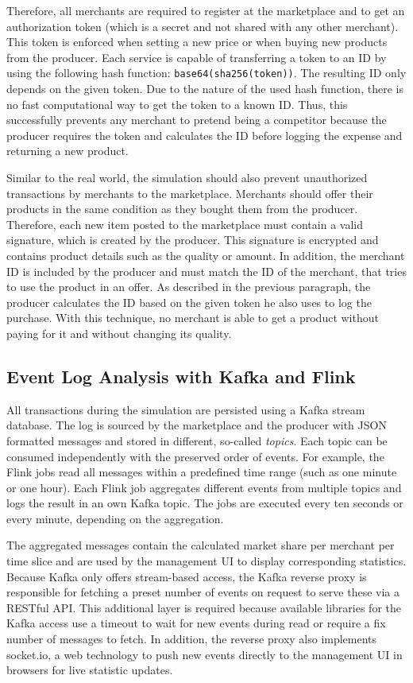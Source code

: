 Therefore, all merchants are required to register at the marketplace and to get an authorization token (which is a secret and not shared with any other merchant). This token is enforced when setting a new price or when buying new products from the producer. Each service is capable of transferring a token to an ID by using the following hash function: \texttt{base64(sha256(token))}. The resulting ID only depends on the given token. Due to the nature of the used hash function, there is no fast computational way to get the token to a known ID. Thus, this successfully prevents any merchant to pretend being a competitor because the producer requires the token and calculates the ID before logging the expense and returning a new product.

Similar to the real world, the simulation should also prevent unauthorized transactions by merchants to the marketplace. Merchants should offer their products in the same condition as they bought them from the producer. Therefore, each new item posted to the marketplace must contain a valid signature, which is created by the producer. This signature is encrypted and contains product details such as the quality or amount. In addition, the merchant ID is included by the producer and must match the ID of the merchant, that tries to use the product in an offer. As described in the previous paragraph, the producer calculates the ID based on the given token he also uses to log the purchase. With this technique, no merchant is able to get a product without paying for it and without changing its quality.

%
\subsection{Event Log Analysis with Kafka and Flink}
\label{sec:LogAnalysis}
%

All transactions during the simulation are persisted using a Kafka stream database. The log is sourced by the marketplace and the producer with JSON formatted messages and stored in different, so-called \emph{topics}. Each topic can be consumed independently with the preserved order of events. For example, the Flink jobs read all messages within a predefined time range (such as one minute or one hour). Each Flink job aggregates different events from multiple topics and logs the result in an own Kafka topic. The jobs are executed every ten seconds or every minute, depending on the aggregation.

The aggregated messages contain the calculated market share per merchant per time slice and are used by the management UI to display corresponding statistics. Because Kafka only offers stream-based access, the Kafka reverse proxy is responsible for fetching a preset number of events on request to serve these via a RESTful API. This additional layer is required because available libraries for the Kafka access use a timeout to wait for new events during read or require a fix number of messages to fetch. In addition, the reverse proxy also implements socket.io, a web technology to push new events directly to the management UI in browsers for live statistic updates. 


